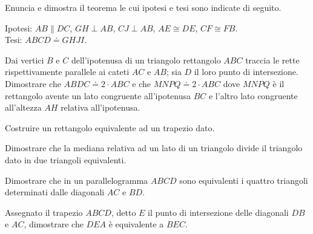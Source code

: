 \begin{multicols}{2}

\begin{esercizio}
\label{ese:7.1}
Enuncia e dimostra il teorema le cui ipotesi e tesi sono indicate 
di seguito.

\noindent Ipotesi: \(AB\parallel DC\), \(GH\perp AB\), \(CJ\perp AB\), 
\(AE\cong DE\), \(CF\cong FB\).\\
\noindent Tesi: \(ABCD\doteq GHJI\).\\

%
\end{esercizio}
 
\begin{esercizio}
\label{ese:7.2}
Dai vertici \(B\) e \(C\) dell'ipotenusa di un triangolo rettangolo \(ABC\) 
traccia le rette rispettivamente parallele ai cateti \(AC\) e \(AB\); sia 
\(D\) il loro punto di intersezione. Dimostrare che \(ABDC\doteq 2\cdot 
ABC\) e che \(MNPQ\doteq 2\cdot ABC\) dove \(MNPQ\) è il rettangolo avente 
un lato congruente all'ipotenusa \(BC\) e l'altro lato congruente 
all'altezza \(AH\) relativa all'ipotenusa.
\end{esercizio}

\begin{esercizio}
\label{ese:7.3}
Costruire un rettangolo equivalente ad un trapezio dato.
\end{esercizio}

\begin{esercizio}
\label{ese:7.4}
Dimostrare che la mediana relativa ad un lato di un triangolo divide 
il triangolo dato in due triangoli equivalenti.
\end{esercizio}

\begin{esercizio}
\label{ese:7.5}
Dimostrare che in un parallelogramma \(ABCD\) sono equivalenti i 
quattro triangoli determinati dalle diagonali \(AC\) e \(BD\).
\end{esercizio}

\begin{esercizio}
\label{ese:7.6}
Assegnato il trapezio \(ABCD\), detto \(E\) il punto di intersezione 
delle diagonali \(DB\) e \(AC\), dimostrare che \(DEA\) è equivalente a 
\(BEC\).
\end{esercizio}


\end{multicols}

